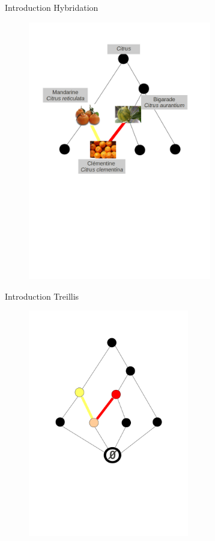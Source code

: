 \documentclass{beamer}
\begin{document}
  \begin{frame}{Introduction}
  \LARGE {\textrm{Hybridation}}
   \begin{figure}
	\includegraphics[width=8cm]{images/memoire_figure3.png} 
    \end{figure}
  \end{frame}

  \begin{frame}{Introduction}
  \LARGE {\textrm{Treillis}}
   \begin{figure}
   	\includegraphics[width=7cm]{images/memoire_figure2_treillis.png}
   \end{figure}
  \end{frame}
\end{document}
